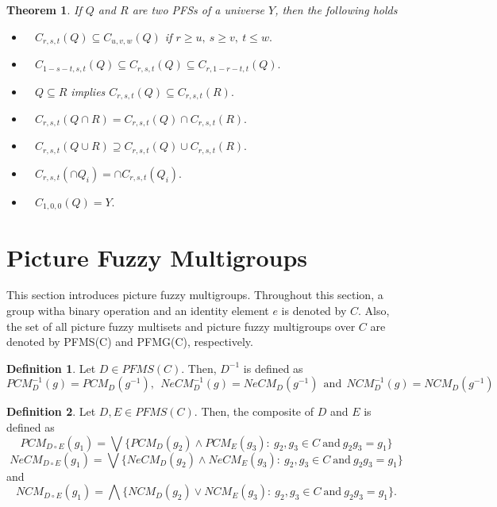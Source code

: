 \documentclass[12pt,letterpaper]{amsart}
\theoremstyle{plain}
\newtheorem{theorem}{Theorem}[section]
\theoremstyle{definition}
\newtheorem{definition}{Definition}[section]
\numberwithin{equation}{section}
\begin{document}
\begin{theorem} \cite{dg} \label{p}
If $Q$ and $R$ are two PFSs of a universe $Y$, then the following holds \begin{itemize}
\item [(i)]~ $C_{r, s, t} (Q) \subseteq C_{u, v, w} (Q)$ if $r \geq u,~ s \geq v,~ t \leq w.$  \ \\
\item [(ii)]~ $C_{1-s-t, s, t}(Q) \subseteq C_{r,s, t}(Q) \subseteq C_{r, 1-r-t, t}(Q).$ \ \\
\item [(iii)]~ $Q \subseteq R$ implies $C_{r, s, t} (Q) \subseteq C_{r, s, t} (R).$ \ \\
\item [(iv)]~ $C_{r, s, t} (Q \cap R) = C_{r, s, t} (Q) \cap C_{r, s, t} (R).$ \ \\
\item [(v)]~ $C_{r, s, t} (Q \cup R) \supseteq C_{r, s, t} (Q) \cup C_{r, s, t} (R).$ \ \\
\item [(vi)]~ $C_{r, s, t} (\cap Q_{i}) = \cap C_{r, s, t} (Q_{i}).$ \ \\
\item [(vii)]~ $ C_{1,0,0}(Q) = Y.$
\end{itemize}
\end{theorem}

\section{Picture Fuzzy Multigroups}
This section introduces picture fuzzy multigroups. Throughout this section, a group witha binary operation and an identity element $e$ is denoted by $C.$ Also, the set of all picture fuzzy multisets and picture fuzzy multigroups over $C$ are denoted by PFMS(C) and PFMG(C), respectively.
\ \\
\begin{definition}
Let $D \in PFMS(C).$ Then, $D^{-1}$ is defined as $$PCM_D^{-1}(g) = PCM_D(g^{-1}),~~ NeCM_D^{-1}(g) = NeCM_D(g^{-1})~~ \text{and}~~ NCM_D^{-1}(g) = NCM_D(g^{-1})$$
\end{definition}
\begin{definition}
Let $D, E \in PFMS(C).$ Then, the composite of $D$ and $E$ is defined as $$PCM_{D \circ E}(g_1) = \bigvee \lbrace PCM_D(g_2) \wedge PCM_E(g_3) :~g_2,g_3 \in C~ \text{and}~ g_2g_3 = g_1 \rbrace $$
$$NeCM_{D \circ E}(g_1) = \bigvee \lbrace NeCM_D(g_2) \wedge NeCM_E(g_3) :~g_2,g_3 \in C~ \text{and}~ g_2g_3 = g_1 \rbrace $$ and $$NCM_{D \circ E}(g_1) = \bigwedge \lbrace NCM_D(g_2) \vee NCM_E(g_3) :~g_2,g_3 \in C~ \text{and}~ g_2g_3 = g_1 \rbrace .$$
\end{definition}
\end{document}
